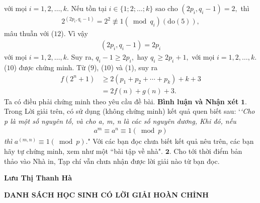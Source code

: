 \begin{multicols}{2}
	với mọi $i = 1, 2, \ldots, k$.
	\vskip 0.05cm
	Nếu tồn tại $i \in \{1; 2; \ldots; k\}$ sao cho $\left( {2{p_i},{q_i} - 1} \right) = 2,$  thì
	\begin{align*}
		{2^{\left( {2{p_i},{q_i} - 1} \right)}} = {2^2}\not  \equiv 1\left( {\bmod {q_i}} \right)\left( {{\text{do}}\left( 5 \right)} \right),	
	\end{align*}
	mâu thuẫn với ($12$). Vì vậy
	\begin{align*}
		\left( {2{p_i},{q_i} - 1} \right) = 2{p_i}
	\end{align*}
	với mọi $i = 1, 2, \ldots, k$.
	\vskip 0.05cm
	Suy ra, ${q_i} - 1 \ge 2{p_i},$  hay ${q_i} \ge 2{p_i} + 1,$  với mọi $i = 1, 2, \ldots, k$.
	\vskip 0.05cm
	($10$) được chứng minh.
	\vskip 0.05cm
	Từ ($9$), ($10$) và ($1$), suy ra
	\begin{align*}
		f\left( {{2^n} + 1} \right) &\ge 2\left( {{p_1} + {p_2} +  \cdots  + {p_k}} \right) + k + 3 \\
		&= 2f\left( n \right) + g\left( n \right) + 3.
	\end{align*}
	Ta có điều phải chứng minh theo yêu cầu đề bài.
	\vskip 0.05cm
	\textbf{\color{thachthuctoanhoc}Bình luận và Nhận xét}
	\vskip 0.05cm
	$\pmb{1.}$ Trong Lời giải trên, có sử dụng (không chứng minh) kết quả quen biết sau:
	\vskip 0.05cm
	`\textit{`Cho p là một số nguyên tố, và cho a, m, n là các số nguyên dương,   Khi đó, nếu
	\begin{align*}
		{a^m} \equiv {a^n} \equiv 1\left( {\bmod p} \right)
	\end{align*}
	thì}  ${a^{\left( {m,n} \right)}} \equiv 1\left( {\bmod p} \right).$"
	\vskip 0.05cm
	Với các bạn đọc chưa biết kết quả nêu trên, các bạn hãy tự chứng minh, xem như một ``bài tập về nhà".
	\vskip 0.05cm
	$\pmb{2.}$ Cho tới thời điểm bản thảo vào Nhà in, Tạp chí vẫn chưa nhận được lời giải nào từ bạn đọc.
	\begin{flushright}
		\textbf{\color{thachthuctoanhoc}Lưu Thị Thanh Hà}
	\end{flushright}
\end{multicols}
\begin{center}
	\textbf{\color{thachthuctoanhoc}DANH SÁCH HỌC SINH CÓ LỜI GIẢI HOÀN CHỈNH}
\end{center}
